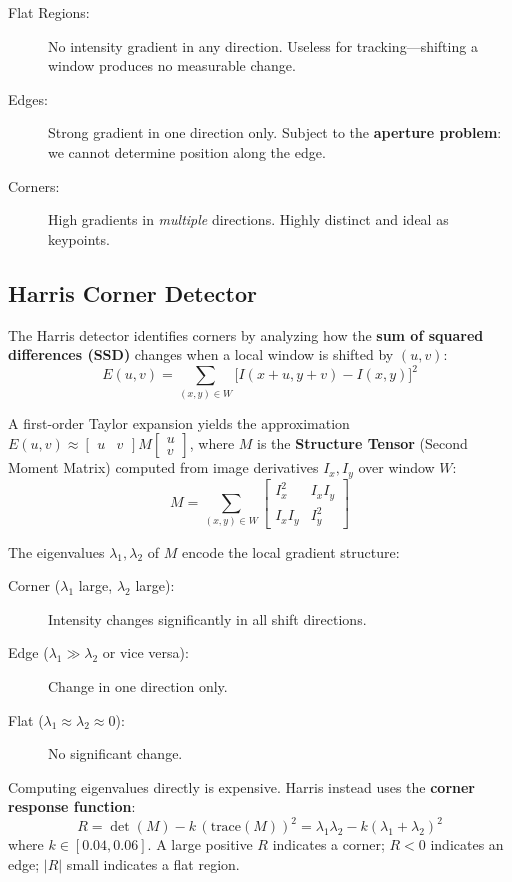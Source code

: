 \begin{description}
    \item[Flat Regions:] No intensity gradient in any direction. Useless for tracking---shifting a window produces no measurable change.
    \item[Edges:] Strong gradient in one direction only. Subject to the \textbf{aperture problem}: we cannot determine position along the edge.
    \item[Corners:] High gradients in \textit{multiple} directions. Highly distinct and ideal as keypoints.
\end{description}

\subsection*{Harris Corner Detector}

The Harris detector identifies corners by analyzing how the \textbf{sum of squared differences (SSD)} changes when a local window is shifted by $(u, v)$:
$$
E(u,v) = \sum_{(x,y) \in W} \bigl[ I(x+u, y+v) - I(x,y) \bigr]^2
$$

A first-order Taylor expansion yields the approximation $E(u,v) \approx \begin{bmatrix} u & v \end{bmatrix} M \begin{bmatrix} u \\ v \end{bmatrix}$, where $M$ is the \textbf{Structure Tensor} (Second Moment Matrix) computed from image derivatives $I_x, I_y$ over window $W$:
$$
M = \sum_{(x,y) \in W} \begin{bmatrix} I_x^2 & I_x I_y \\ I_x I_y & I_y^2 \end{bmatrix}
$$

The eigenvalues $\lambda_1, \lambda_2$ of $M$ encode the local gradient structure:

\begin{description}
    \item[Corner ($\lambda_1$ large, $\lambda_2$ large):] Intensity changes significantly in all shift directions.
    \item[Edge ($\lambda_1 \gg \lambda_2$ or vice versa):] Change in one direction only.
    \item[Flat ($\lambda_1 \approx \lambda_2 \approx 0$):] No significant change.
\end{description}

\begin{remark}
Computing eigenvalues directly is expensive. Harris instead uses the \textbf{corner response function}:
$$R = \det(M) - k\,(\text{trace}(M))^2 = \lambda_1 \lambda_2 - k(\lambda_1 + \lambda_2)^2$$
where $k \in [0.04, 0.06]$. A large positive $R$ indicates a corner; $R < 0$ indicates an edge; $|R|$ small indicates a flat region.
\end{remark}

